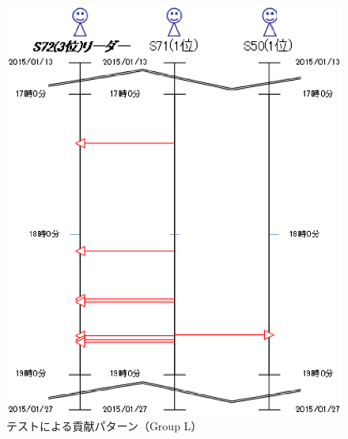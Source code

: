 \begin{figure}[tb]
	\begin{center}
		\includegraphics[scale=0.4]{img/flowL.eps}
		\caption{テストによる貢献パターン（Group L）}
		\label{fig:flowL}
	\end{center}
\end{figure}

